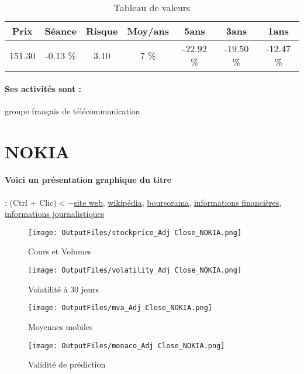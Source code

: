 \documentclass[11pt,a4paper]{report}%
\begin{document}
\begin{table}[H]
  \centering
    \begin{tabular}{|c|c|c|c|c|c|c|}
    \hline
    Prix & Séance & Risque  & Moy/ans & 5ans & 3ans & 1ans \\
    \hline
    151.30 &    -0.13 \%    & 3.10 & 7 \% & -22.92 \% & -19.50 \% & -12.47 \% \\
    \hline
    \end{tabular}%
        \label{tab:table_ILIAD}%
      \caption{Tableau de valeurs}
\end{table}%

\paragraph{Ses activités sont : } groupe français de télécommunication 
    
    \newpage

\section{NOKIA}

\paragraph{Voici un présentation graphique du titre} : (Ctrl + Clic)$<-$\href{https://www.nokia.com/about-us/investors/}{site web}, \href{https://fr.wikipedia.org/wiki/Nokia}{wikipédia}, \href{https://www.boursorama.com/cours/1rPNOKIA}{boursorama}, \href{https://www.qwant.com/?q=site:https:%2f%2fwww.easybourse.com%2faction-societe%2fNOKIA&t=web&client=ext-firefox-hp}{informations financières}, \href{https://bourse.lerevenu.com/cours-de-bourse/fiche-valeur-synthese/NOKIA/NOKIA-FR}{informations journalistiques}
\begin{figure}[!htb]
   \begin{minipage}{0.5\textwidth}
     \centering
     \texttt{[image: OutputFiles/stockprice\_Adj Close\_NOKIA.png]}
     \caption{Cours et Volumes}\label{Fig:price_NOKIA}
   \end{minipage}\hfill
   \begin{minipage}{0.5\textwidth}
     \centering
     \texttt{[image: OutputFiles/volatility\_Adj Close\_NOKIA.png]}
     \caption{Volatilité à 30 jours}\label{Fig:volat_NOKIA}
   \end{minipage}
\end{figure}
\begin{figure}[!htb]
   \begin{minipage}{0.5\textwidth}
     \centering
     \texttt{[image: OutputFiles/mva\_Adj Close\_NOKIA.png]}
     \caption{Moyennes mobiles}\label{Fig:mva_NOKIA}
   \end{minipage}\hfill
   \begin{minipage}{0.5\textwidth}
     \centering
     \texttt{[image: OutputFiles/monaco\_Adj Close\_NOKIA.png]}
     \caption{Validité de prédiction}\label{Fig:prediction_NOKIA}
   \end{minipage}
\end{figure}
\end{document}
